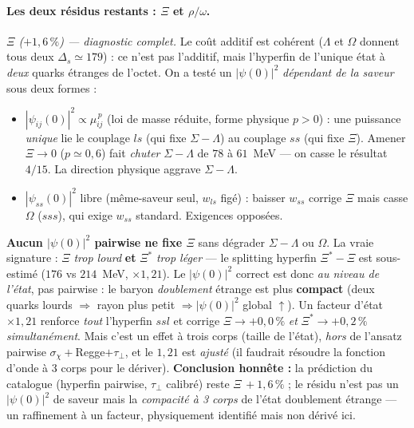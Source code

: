 \documentclass[11pt]{article}
\begin{document}
\paragraph{Les deux résidus restants : $\Xi$ et $\rho/\omega$.}
\emph{$\Xi$ ($+1{,}6\,\%$) --- diagnostic complet.} Le coût additif est cohérent ($\Lambda$ et $\Omega$ donnent tous deux $\Delta_s\simeq179$) : ce n'est pas l'additif, mais l'hyperfin de l'unique état à \emph{deux} quarks étranges de l'octet. On a testé un $|\psi(0)|^2$ \emph{dépendant de la saveur} sous deux formes :
\begin{itemize}\itemsep1pt
\item $|\psi_{ij}(0)|^2\propto\mu_{ij}^{\,p}$ (loi de masse réduite, forme physique $p{>}0$) : une puissance \emph{unique} lie le couplage $ls$ (qui fixe $\Sigma{-}\Lambda$) au couplage $ss$ (qui fixe $\Xi$). Amener $\Xi\to0$ ($p{\simeq}0{,}6$) fait \emph{chuter} $\Sigma{-}\Lambda$ de $78$ à $61$~MeV --- on casse le résultat $4/15$. La direction physique aggrave $\Sigma{-}\Lambda$.
\item $|\psi_{ss}(0)|^2$ libre (même-saveur seul, $w_{ls}$ figé) : baisser $w_{ss}$ corrige $\Xi$ mais casse $\Omega$ ($sss$), qui exige $w_{ss}$ standard. Exigences opposées.
\end{itemize}
\textbf{Aucun $|\psi(0)|^2$ pairwise ne fixe $\Xi$} sans dégrader $\Sigma{-}\Lambda$ ou $\Omega$. La vraie signature : $\Xi$ \emph{trop lourd} \textbf{et} $\Xi^*$ \emph{trop léger} --- le splitting hyperfin $\Xi^*{-}\Xi$ est sous-estimé ($176$ vs $214$~MeV, $\times1{,}21$). Le $|\psi(0)|^2$ correct est donc \emph{au niveau de l'état}, pas pairwise : le baryon \emph{doublement} étrange est plus \textbf{compact} (deux quarks lourds $\Rightarrow$ rayon plus petit $\Rightarrow |\psi(0)|^2$ global $\uparrow$). Un facteur d'état $\times1{,}21$ renforce \emph{tout} l'hyperfin $ssl$ et corrige $\Xi\to+0{,}0\,\%$ \emph{et} $\Xi^*\to+0{,}2\,\%$ \emph{simultanément}. Mais c'est un effet à trois corps (taille de l'état), \emph{hors} de l'ansatz pairwise $\sigma_\chi{+}$Regge${+}\tau_\perp$, et le $1{,}21$ est \emph{ajusté} (il faudrait résoudre la fonction d'onde à 3 corps pour le dériver). \textbf{Conclusion honnête :} la prédiction du catalogue (hyperfin pairwise, $\tau_\perp$ calibré) reste $\Xi\,{+}1{,}6\,\%$ ; le résidu n'est pas un $|\psi(0)|^2$ de saveur mais la \emph{compacité à 3 corps} de l'état doublement étrange --- un raffinement à un facteur, physiquement identifié mais non dérivé ici.
\end{document}
